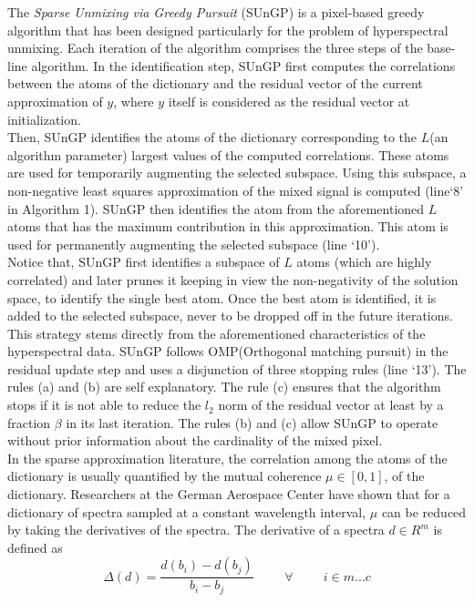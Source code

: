 \documentclass[12pt]{svproc}
\begin{document}
The \emph{Sparse  Unmixing  via  Greedy  Pursuit} (SUnGP) is a  pixel-based  greedy  algorithm  that  has  been  designed particularly for the problem of hyperspectral unmixing. Each  iteration  of  the  algorithm  comprises  the  three  steps  of  the  base-line  algorithm.  In  the identification step,  SUnGP  first  computes the  correlations  between  the  atoms  of  the  dictionary  and  the residual  vector  of  the  current  approximation  of $y$,  where $y$ itself is considered as the residual vector at initialization.\\

Then, SUnGP identifies the atoms of the dictionary corresponding to the $L$(an algorithm parameter) largest values of the computed correlations. These atoms are used for temporarily augmenting the selected subspace. Using this subspace, a non-negative least squares  approximation  of  the  mixed  signal  is  computed  (line‘8’ in Algorithm 1). SUnGP then identifies the atom from the aforementioned $L$ atoms  that  has  the  maximum  contribution
in  this  approximation.  This  atom  is  used  for  permanently
augmenting the selected subspace (line ‘10’).\\

Notice that, SUnGP first identifies a subspace of $L$ atoms (which  are  highly  correlated)  and  later  prunes  it  keeping  in view  the  non-negativity  of  the  solution  space,  to  identify  the single best atom. Once the best atom is identified, it is added to the selected subspace, never to be dropped off in the future iterations. This strategy stems directly from the aforementioned
characteristics of the hyperspectral data. SUnGP follows OMP(Orthogonal matching
pursuit) in  the residual  update step  and  uses  a  disjunction  of  three
stopping  rules (line  ‘13’).  The  rules  (a)  and  (b)  are  self
explanatory.  The  rule  (c)  ensures  that  the  algorithm  stops  if
it  is  not  able  to  reduce  the $l_{2}$ norm  of  the  residual  vector  at
least by a fraction $\beta$ in its last iteration. The rules (b) and (c)
allow  SUnGP  to  operate  without  prior  information  about  the
cardinality of the mixed pixel.\\

In   the   sparse   approximation   literature,   the   correlation
among  the  atoms  of  the  dictionary  is  usually  quantified  by
the mutual coherence $\mu \in [0,1]$, of the dictionary.
Researchers at the German Aerospace Center have shown that  for  a  dictionary  of  spectra  sampled  at  a  constant  wavelength interval, $\mu$ can be reduced by taking the derivatives of the spectra. The derivative of a spectra $d \in R^{m}$ is defined as
\begin{equation}
    \Delta(d) = \frac{d(b_{i}) - d(b_{j})}{b_{i} - b_{j}} \hspace{1cm} \forall \hspace{1cm} i \in {m...c}
\end{equation}
\end{document}

